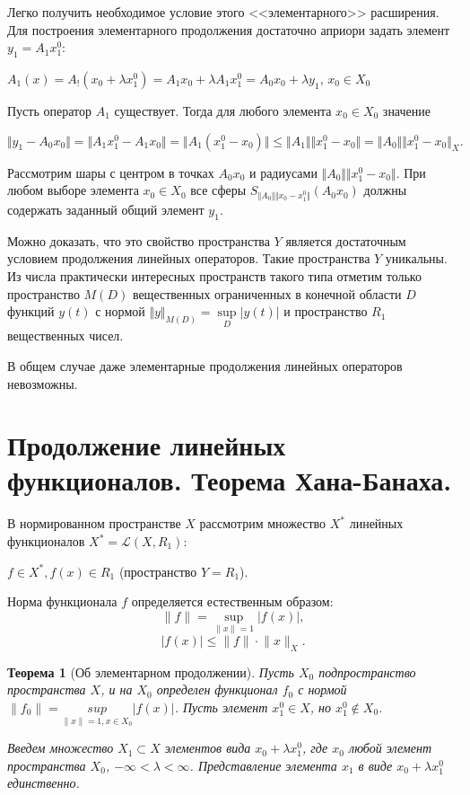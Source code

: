 \documentclass[12pt,a4paper,titlepage,oneside]{book}
\theoremstyle{definition}
\theoremstyle{plain}
\theoremstyle{break}
\newtheorem*{theorem-break}{Теорема}
\theoremstyle{remark}
\theoremstyle{remark}
\theoremstyle{remark}
\theoremstyle{remark}
\theoremstyle{plain}
\theoremstyle{plain}
\begin{document}
Легко получить необходимое условие этого <<элементарного>> расширения. Для построения элементарного продолжения достаточно априори задать элемент $y_1 = A_1 x_1^0$:
\begin{center}
$A_1(x) = A_!(x_0+\lambda x_1^0) = A_1x_0+\lambda A_1x_1^0 = A_0 x_0 + \lambda y_1$, $x_0 \in X_0$
\end{center}

Пусть оператор $A_1$ существует. Тогда для любого элемента $x_0 \in X_0$ значение
\begin{center}
$\Vert y_1 -A_0x_0 \Vert = \Vert A_1x_1^0 - A_1x_0 \Vert = \Vert A_1(x_1^0 - x_0) \Vert \leqslant \Vert A_1 \Vert \Vert x_1^0 - x_0 \Vert = \Vert A_0 \Vert \Vert x_1^0 - x_0 \Vert_X.$
\end{center}

Рассмотрим шары с центром в точках $A_0x_0$ и радиусами $\Vert A_0 \Vert \Vert x_1^0 - x_0 \Vert$. При любом выборе элемента $x_0 \in X_0$ все сферы $S_{\Vert A_0 \Vert \Vert x_0 - x_1^0 \Vert}(A_0x_0)$ должны содержать заданный общий элемент $y_1$.

Можно доказать, что это свойство пространства $Y$ является достаточным условием продолжения линейных операторов. Такие пространства $Y$ уникальны. Из числа практически интересных пространств такого типа отметим только пространство $M(\mathit{D})$ вещественных ограниченных в конечной области $D$ функций $y(t)$ с нормой $\Vert y\Vert_{M(D)} = \sup \limits_D\lvert y(t) \rvert$ и пространство $R_1$ вещественных чисел.

В общем случае даже элементарные продолжения линейных операторов невозможны.

\section{Продолжение линейных функционалов. Теорема Хана-Банаха.}
В нормированном пространстве $X$ рассмотрим множество $X^*$ линейных функционалов $X^*=\mathcal{L}(X, R_1):$
\begin{center}
$ f\in X^*, f(x)\in R_1$ (пространство $Y=R_1$).
\end{center}
Норма функционала $f$ определяется естественным образом:
$$\lVert f \rVert = \underset{\lVert x \rVert=1}{\sup} \lvert f(x) \rvert,$$
$$\lvert f(x) \rvert \leqslant \lVert f \rVert \cdot \lVert x \rVert_X.$$

\begin{theorem-break}[Об элементарном продолжении]
Пусть $X_0$ подпространство пространства $X$, и на $X_0$ определен функционал $f_0$ с нормой $\lVert f_0 \rVert = \underset{\lVert x \rVert=1, x \in X_0}{sup}|f(x)|$. Пусть элемент $x_1^0 \in X$, но $x_1^0 \notin X_0$.

Введем множество $X_1 \subset X$ элементов вида $x_0+\lambda x_1^0$, где $x_0$ любой элемент пространства $X_0$, $-\infty < \lambda < \infty$. Представление элемента $x_1$ в виде $x_0+\lambda x_1^0$ единственно.
\end{theorem-break}
\end{document}
